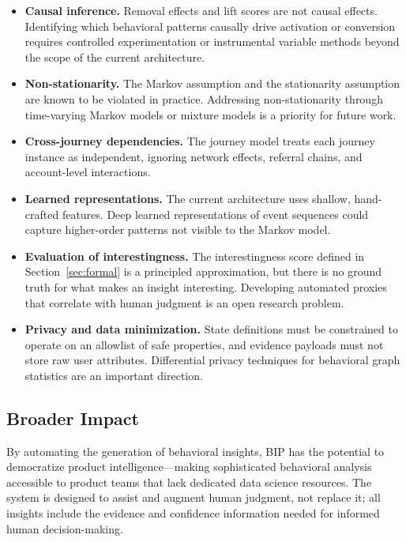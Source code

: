\documentclass[12pt, a4paper]{article}
\begin{document}
\begin{itemize}[leftmargin=1.5em]
  \item \textbf{Causal inference.} Removal effects and lift scores are not causal effects. Identifying which behavioral patterns causally drive activation or conversion requires controlled experimentation or instrumental variable methods beyond the scope of the current architecture.

  \item \textbf{Non-stationarity.} The Markov assumption and the stationarity assumption are known to be violated in practice. Addressing non-stationarity through time-varying Markov models or mixture models \cite{harbich2017} is a priority for future work.

  \item \textbf{Cross-journey dependencies.} The journey model treats each journey instance as independent, ignoring network effects, referral chains, and account-level interactions.

  \item \textbf{Learned representations.} The current architecture uses shallow, hand-crafted features. Deep learned representations of event sequences could capture higher-order patterns not visible to the Markov model.

  \item \textbf{Evaluation of interestingness.} The interestingness score defined in Section~\ref{sec:formal} is a principled approximation, but there is no ground truth for what makes an insight interesting. Developing automated proxies that correlate with human judgment is an open research problem.

  \item \textbf{Privacy and data minimization.} State definitions must be constrained to operate on an allowlist of safe properties, and evidence payloads must not store raw user attributes. Differential privacy techniques for behavioral graph statistics are an important direction.
\end{itemize}

\subsection{Broader Impact}

By automating the generation of behavioral insights, BIP has the potential to democratize product intelligence---making sophisticated behavioral analysis accessible to product teams that lack dedicated data science resources. The system is designed to assist and augment human judgment, not replace it; all insights include the evidence and confidence information needed for informed human decision-making.
\end{document}
